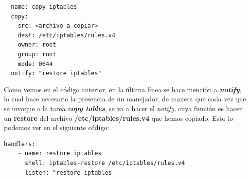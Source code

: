 \documentclass[11pt]{article}
\begin{document}
\begin{lstlisting}[style=C,numbers=none]
- name: copy iptables
  copy:
    src: <archivo a copiar>
    dest: /etc/iptables/rules.v4
    owner: root
    group: root
    mode: 0644
  notify: "restore iptables"
\end{lstlisting}

Como vemos en el código anterior, en la última línea se hace mención a \textbf{\textit{notify}}, lo cual hace necesario la presencia de un manejador, de manera que cada vez que se invoque a la tarea \textbf{\textit{copy tables}}, se va a hacer el \textit{notify}, cuya función es hacer un \textbf{restore} del archivo \textbf{/etc/iptables/rules.v4} que hemos copiado. Esto lo podemos ver en el siguiente código:

\begin{lstlisting}[style=C,numbers=none]
handlers:
    - name: restore iptables
      shell: iptables-restore /etc/iptables/rules.v4
      listen: "restore iptables
\end{lstlisting}

\newpage
\end{document}

